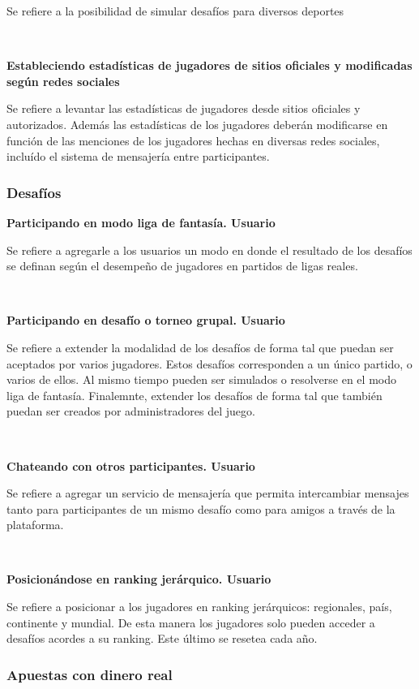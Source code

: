 Se refiere a la posibilidad de simular desafíos para diversos deportes

~

\textbf{Estableciendo estadísticas de jugadores de sitios oficiales y modificadas según redes sociales}

Se refiere a levantar las estadísticas de jugadores desde sitios oficiales y autorizados. Además las estadísticas
de los jugadores deberán modificarse en función de las menciones de los jugadores hechas en diversas redes sociales,
incluído el sistema de mensajería entre participantes.

\subsubsection{Desafíos}

\textbf{Participando en modo liga de fantasía. Usuario}

Se refiere a agregarle a los usuarios un modo en donde el resultado de los desafíos se definan según el desempeño de jugadores en partidos 
de ligas reales.

~

\textbf{Participando en desafío o torneo grupal. Usuario}

Se refiere a extender la modalidad de los desafíos de forma tal que puedan ser aceptados por varios jugadores. Estos desafíos corresponden a
un único partido, o varios de ellos. Al mismo tiempo pueden ser simulados o resolverse en el modo liga de fantasía.
Finalemnte, extender los desafíos de forma tal que también puedan ser creados por administradores del juego. 

~

\textbf{Chateando con otros participantes. Usuario}

Se refiere a agregar un servicio de mensajería que permita intercambiar mensajes tanto para participantes de un mismo desafío como para
amigos a través de la plataforma.

~

\textbf{Posicionándose en ranking jerárquico. Usuario}

Se refiere a posicionar a los jugadores en ranking jerárquicos: regionales, país, continente y mundial.
De esta manera los jugadores solo pueden acceder a desafíos acordes a su ranking. Este último se resetea cada año.

\subsubsection{Apuestas con dinero real}


